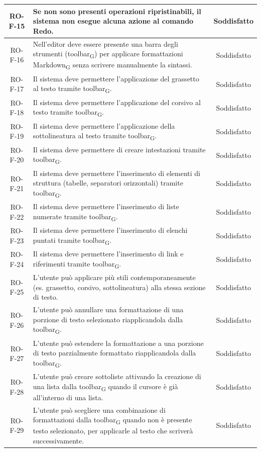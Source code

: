 \documentclass[11pt,a4paper]{article}
\newcommand{\gls}[1]{#1\textsubscript{G}}
\begin{document}
\begin{longtable}{|c|p{11cm}|c|}
\hline
RO-F-15 & Se non sono presenti operazioni ripristinabili, il sistema non esegue alcuna azione al comando Redo. & Soddisfatto \\
\hline
RO-F-16 & Nell'editor deve essere presente una barra degli strumenti (\gls{toolbar}) per applicare formattazioni \gls{Markdown} senza scrivere manualmente la sintassi. & Soddisfatto \\
\hline
RO-F-17 & Il sistema deve permettere l'applicazione del grassetto al testo tramite \gls{toolbar}. & Soddisfatto \\
\hline
RO-F-18 & Il sistema deve permettere l'applicazione del corsivo al testo tramite \gls{toolbar}. & Soddisfatto \\
\hline
RO-F-19 & Il sistema deve permettere l'applicazione della sottolineatura al testo tramite \gls{toolbar}. & Soddisfatto\\
\hline
RO-F-20 & Il sistema deve permettere di creare intestazioni tramite \gls{toolbar}. & Soddisfatto\\
\hline
RO-F-21 & Il sistema deve permettere l'inserimento di elementi di struttura (tabelle, separatori orizzontali) tramite \gls{toolbar}. & Soddisfatto\\
\hline
RO-F-22 & Il sistema deve permettere l'inserimento di liste numerate tramite \gls{toolbar}. & Soddisfatto\\
\hline
RO-F-23 & Il sistema deve permettere l'inserimento di elenchi puntati tramite \gls{toolbar}. & Soddisfatto\\
\hline
RO-F-24 & Il sistema deve permettere l'inserimento di link e riferimenti tramite \gls{toolbar}. & Soddisfatto \\
\hline
RO-F-25 & L'utente può applicare più stili contemporaneamente (es. grassetto, corsivo, sottolineatura) alla stessa sezione di testo. & Soddisfatto \\
\hline
RO-F-26 & L'utente può annullare una formattazione di una porzione di testo selezionato riapplicandola dalla \gls{toolbar}. & Soddisfatto \\
\hline
RO-F-27 & L'utente può estendere la formattazione a una porzione di testo parzialmente formattato riapplicandola dalla \gls{toolbar}. & Soddisfatto \\
\hline
RO-F-28 & L'utente può creare sottoliste attivando la creazione di una lista dalla \gls{toolbar} quando il cursore è già all'interno di una lista. & Soddisfatto \\
\hline
RO-F-29 & L'utente può scegliere una combinazione di formattazioni dalla \gls{toolbar} quando non è presente testo selezionato, per applicarle al testo che scriverà successivamente. & Soddisfatto \\

\end{longtable}
\end{document}
